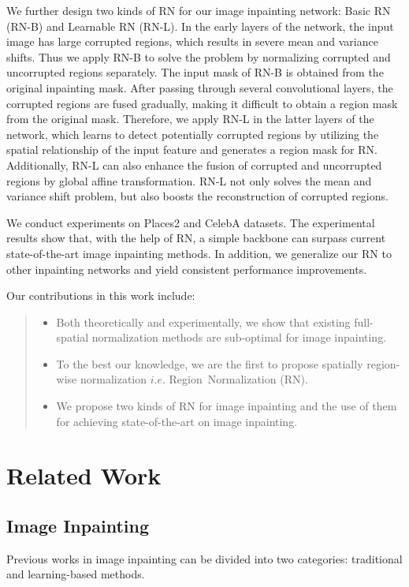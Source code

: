 \documentclass[letterpaper]{article} %
\begin{document}
We further design two kinds of RN for our image inpainting network: Basic RN (RN-B) and Learnable RN (RN-L). In the early layers of the network, the input image has large corrupted regions, which results in severe mean and variance shifts. Thus we apply RN-B to solve the problem by normalizing corrupted and uncorrupted regions separately. The input mask of RN-B is obtained from the original inpainting mask. After passing through several convolutional layers, the corrupted regions are fused gradually, making it difficult to obtain a region mask from the original mask. Therefore, we apply RN-L in the latter layers of the network, which learns to detect potentially corrupted regions by utilizing the spatial relationship of the input feature and generates a region mask for RN. Additionally, RN-L can also enhance the fusion of corrupted and uncorrupted regions by global affine transformation. RN-L not only solves the mean and variance shift problem, but also boosts the reconstruction of corrupted regions.

We conduct experiments on Places2 \cite{zhou2017places} and CelebA \cite{liu2015deep} datasets. The experimental results show that, with the help of RN, a simple backbone can surpass current state-of-the-art image inpainting methods. In addition, we generalize our RN to other inpainting networks and yield consistent performance improvements.

Our contributions in this work include:
\begin{quote}
	\begin{itemize}
		\item Both theoretically and experimentally, we show that existing full-spatial normalization methods are sub-optimal for image inpainting.
		\item To the best our knowledge, we are the first to \mbox{propose} spatially region-wise normalization $i.e.$ \mbox{Region Normalization} (RN).
		\item We propose two kinds of RN for image inpainting and the use of them for achieving state-of-the-art on image inpainting.
	\end{itemize}
\end{quote}



\section{Related Work}
\subsection{Image Inpainting}
Previous works in image inpainting can be divided into two categories: traditional and learning-based methods.
\end{document}
